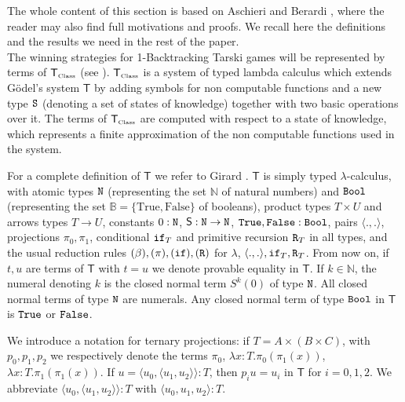 \documentclass[copyright,creativecommons]{eptcs}
\newcommand{\Nat}                      { {\tt N} }
\newcommand{\Bool}                     { {\tt Bool} }
\newcommand{\State}                    { {\tt S} }
\newcommand{\NatSet}                   {\mathbb{N}}
\newcommand{\BoolSet}                  {\mathbb{B}}
\newcommand{\SystemT}                  {\mathsf{T}}
\newcommand{\True}                     { {\tt{True}} }
\newcommand{\False}                    { {\tt{False}} }
\newcommand{\Class}                    {\mbox{\tiny Class}}
\newcommand{\SystemTClass}             {{\SystemT_{\Class}}}
\newcommand{\proj}                     { {p} }
\begin{document}
The whole content of this section is based on Aschieri and Berardi \cite{Aschieri}, where the reader may also find full motivations and proofs. We recall here the definitions and the results we need in the rest of the paper.\\
The winning strategies for 1-Backtracking Tarski games will be represented by terms of $\SystemTClass$ (see \cite{Aschieri}). $\SystemTClass$ is a system of typed lambda calculus which extends G\"odel's system $\SystemT$ by adding symbols for non computable functions and a new type $\State$ (denoting a set of states of knowledge) together with two basic operations over it. The terms of $\SystemTClass$ are computed with respect to  a state of knowledge, which represents a finite approximation of the non computable functions used in the system. 

For a complete definition of $\SystemT$ we refer to Girard \cite{Girard}. $\SystemT$ is simply typed $\lambda$-calculus, with atomic types $\Nat$ (representing the set $\NatSet$ of natural numbers) and $\Bool$ (representing the set $\BoolSet = \{\mbox{True},\mbox{False}\}$ of booleans), product types $T \times U$ and arrows types $T \rightarrow U$, constants $0: \Nat$, $\mathsf{S}:\Nat\rightarrow \Nat$, $\True, \False: \Bool$, pairs $\langle.,.\rangle$, projections $\pi_0, \pi_1$, conditional ${\tt if}_T$ and primitive recursion ${\tt R}_T$ in all types, and the usual reduction rules $(\beta),(\pi),({\tt if}),({\tt R})$ for $\lambda$, $\langle .,.\rangle,{\tt if}_T,{\tt R}_T$. From now on, if $t, u$ are terms of $\SystemT$ with $t=u$ we denote provable equality in $\SystemT$. If $k \in \NatSet$, the numeral denoting $k$ is the closed normal term $ S^k(0)$ of type $\Nat$.  All closed normal terms of type $\Nat$ are numerals. Any closed normal term of type $\Bool$ in $\SystemT$ is ${\True}$ or ${\False}$.

We introduce a notation for ternary projections: if $T = A \times (B \times C)$, with $p_0, p_1, p_2$ we respectively denote the terms $\pi_0$, $\lambda x:T.\pi_0(\pi_1(x))$, $\lambda x:T.\pi_1(\pi_1(x))$.
If $u = \langle u_0,\langle u_1,u_2\rangle \rangle : T$, then $\proj_iu=u_i$ in $\SystemT$ for $i=0,1,2$. We abbreviate $\langle u_0,\langle u_1,u_2\rangle \rangle :T $ with $\langle u_0,u_1,u_2\rangle : T$. 
\end{document}
